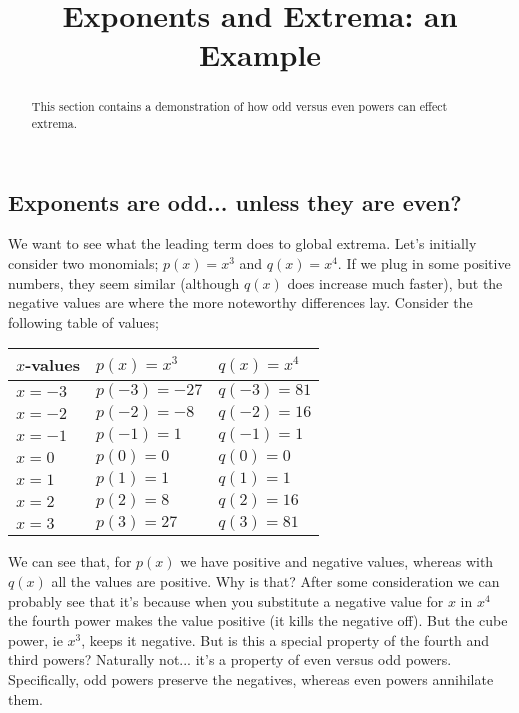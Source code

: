 \documentclass{ximeraXloud}
\title{Exponents and Extrema: an Example}
\begin{document}
\begin{abstract}
    This section contains a demonstration of how odd versus even powers can effect extrema.
\end{abstract}
\maketitle

\subsection*{Exponents are odd... unless they are even?}

    We want to see what the leading term does to global extrema. Let's initially consider two monomials; $p(x) = x^3$ and $q(x) = x^4$. If we plug in some positive numbers, they seem similar (although $q(x)$ does increase much faster), but the negative values are where the more noteworthy differences lay. Consider the following table of values;\\
    
    \begin{center}
        \begin{tabular}{| l l l |}\hline
            $x$-values      & $p(x) = x^3$      & $q(x) = x^4$  \\ \hline
            $x = -3$        & $p(-3) = -27$     & $q(-3) = 81$  \\
            $x = -2$        & $p(-2) = -8$      & $q(-2) = 16$  \\
            $x = -1$        & $p(-1) = 1$       & $q(-1) = 1$   \\
            $x = 0$         & $p(0) = 0$        & $q(0) = 0$    \\
            $x = 1$         & $p(1) = 1$        & $q(1) = 1$    \\
            $x = 2$         & $p(2) = 8$        & $q(2) = 16$   \\
            $x = 3$         & $p(3) = 27$       & $q(3) = 81$   \\\hline
        \end{tabular}
    \end{center}
    
    We can see that, for $p(x)$ we have positive and negative values, whereas with $q(x)$ all the values are positive.  Why is that? After some consideration we can probably see that it's because when you substitute a negative value for $x$ in $x^4$ the fourth power makes the value positive (it kills the negative off). But the cube power, ie $x^3$, keeps it negative. But is this a special property of the fourth and third powers? Naturally not... it's a property of even versus odd powers. Specifically, odd powers preserve the negatives, whereas even powers annihilate them.
    
\end{document}

